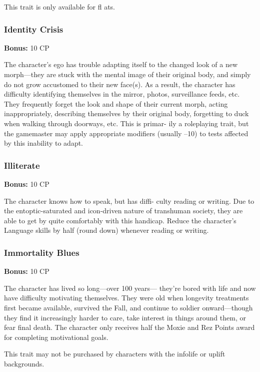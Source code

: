 This trait is only available for fl ats.

\subsubsection{Identity Crisis}

\textbf{Bonus:} 10 CP

The character's ego has trouble adapting itself to 
the changed look of a new morph—they are stuck 
with the mental image of their original body, and 
simply do not grow accustomed to their new face(s). 
As a result, the character has difficulty  identifying 
themselves in the mirror, photos, surveillance feeds, 
etc. They frequently forget the look and shape of their 
current morph, acting inappropriately, describing 
themselves by their original body, forgetting to duck 
when walking through doorways, etc. This is primar-
ily a roleplaying trait, but the gamemaster may apply 
appropriate modifiers (usually –10) to tests affected 
by this inability to adapt.

\subsubsection{Illiterate}

\textbf{Bonus:} 10 CP

The character knows how to speak, but has diffi-
culty reading or writing. Due to the entoptic-saturated 
and icon-driven nature of transhuman society, they are 
able to get by quite comfortably with this handicap. 
Reduce the character's Language skills by half (round 
down) whenever reading or writing.

\subsubsection{Immortality Blues}

\textbf{Bonus:} 10 CP

The character has lived so long—over 100 years—
they're bored with life and now have difficulty 
motivating themselves. They were old when longevity 
treatments first became available, survived the Fall, 
and continue to soldier onward—though they find 
it increasingly harder to care, take interest in things 
around them, or fear final death. The character only 
receives half the Moxie and Rez Points award for 
completing motivational goals.

This trait may not be purchased by characters with 
the infolife or uplift backgrounds.

